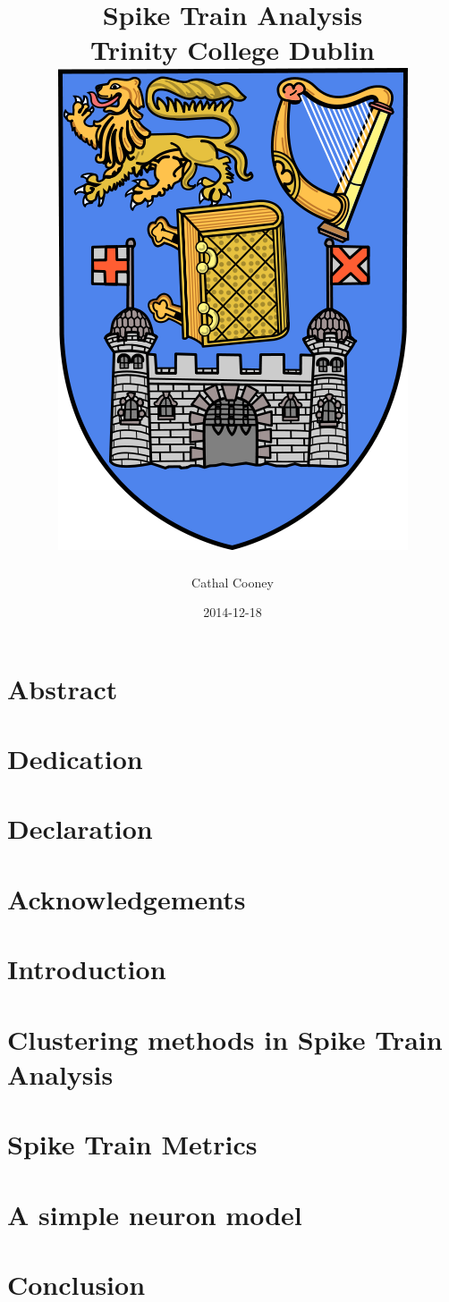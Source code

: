 \documentclass[12pt]{report}
\title{
	{Spike Train Analysis} \\
	{\large Trinity College Dublin} \\
	{\includegraphics{tcd.png}}
}
\author{Cathal Cooney}
\date{2014-12-18}
\begin{document}
\maketitle

\chapter*{Abstract}

\chapter*{Dedication}

\chapter*{Declaration}

\chapter*{Acknowledgements}

\tableofcontents


\chapter{Introduction}


\chapter{Clustering methods in Spike Train Analysis}


\chapter{Spike Train Metrics}


\chapter{A simple neuron model}


\chapter{Conclusion}




\end{document}
